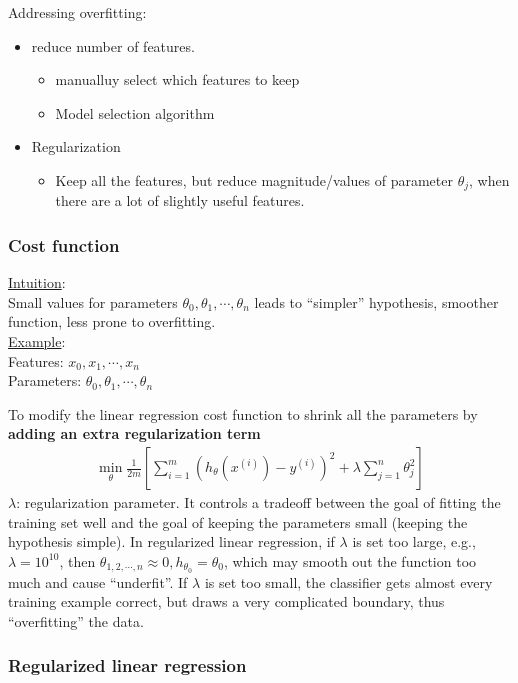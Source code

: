 Addressing overfitting:

\begin{itemize}
\item
reduce number of features.
	\begin{itemize}
	\item manualluy select which features to keep
	\item Model selection algorithm
	\end{itemize}
	
\item
Regularization
\begin{itemize}
	\item Keep all the features, but reduce magnitude/values of parameter $\theta_j$, when there are a lot of slightly useful features.
	\end{itemize}
\end{itemize}

\subsubsection{Cost function}
\underline{Intuition}:\\
Small values for parameters $\theta_0, \theta_1, \cdots, \theta_n$ leads to ``simpler'' hypothesis, smoother function, less prone to overfitting.\\
\underline{Example}:\\
Features: $x_0, x_1, \cdots, x_n$\\
Parameters: $\theta_0, \theta_1, \cdots, \theta_n$ 

To modify the linear regression cost function to shrink all the parameters by \textbf{adding an extra regularization term}
\begin{align}
\underset{\theta}{\min}\frac{1}{2m} \left[ \sum_{i=1}^m(h_\theta(x^{(i)})-y^{(i)})^2 + \lambda \sum_{j=1}^n\theta_j^2 \right]
\end{align}
$\lambda$: regularization parameter. It controls a tradeoff between the goal of fitting the training set well and the goal of keeping the parameters small (keeping the hypothesis simple). In regularized linear regression, if $\lambda$ is set too large, e.g., $\lambda = 10^{10}$, then $\theta_{1, 2, \cdots, n} \approx 0, h_{\theta_0}=\theta_0$, which may smooth out the function too much and cause ``underfit''. If $\lambda$ is set too small, the classifier gets almost every training example correct, but draws a very complicated boundary, thus ``overfitting'' the data.

\subsubsection{Regularized linear regression}

